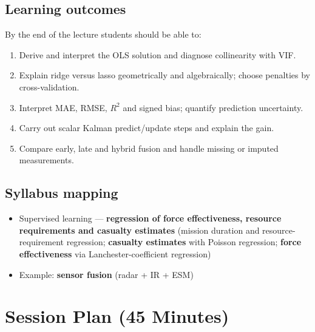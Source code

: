 \documentclass[11pt]{article}
\begin{document}
\subsection*{Learning outcomes}By the end of the lecture students should be able to:\begin{enumerate}\item Derive and interpret the OLS solution and diagnose collinearity with VIF.\item Explain ridge versus lasso geometrically and algebraically; choose penalties by cross-validation.\item Interpret MAE, RMSE, $R^2$ and signed bias; quantify prediction uncertainty.\item Carry out scalar Kalman predict/update steps and explain the gain.\item Compare early, late and hybrid fusion and handle missing or imputed measurements.\end{enumerate}

\subsection*{Syllabus mapping}\begin{itemize}\item Supervised learning --- \textbf{regression of force effectiveness, resource requirements and casualty estimates} (mission duration and resource-requirement regression; \textbf{casualty estimates} with Poisson regression; \textbf{force effectiveness} via Lanchester-coefficient regression)\item Example: \textbf{sensor fusion} (radar + IR + ESM)\end{itemize}

\section{Session Plan (45 Minutes)}
\end{document}
